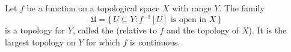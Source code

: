 Let $f$ be a function on a topological space $X$ with range $Y$. The family
$$\mathfrak{U} = \{\, U \subseteq Y : f^{-1}[U] \text{ is open in } X \,\}$$
is a topology for $Y$, called the  (relative to $f$ and the topology of $X$). It is the largest topology on $Y$ for which $f$ is continuous.
